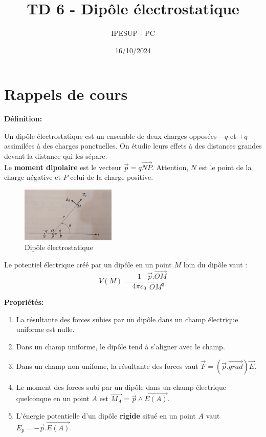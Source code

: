 \documentclass{article}
\title{TD 6 - Dipôle électrostatique}
\author{IPESUP - PC }
\date{16/10/2024}
\begin{document}
\maketitle

\section{Rappels de cours}

\textbf{Définition: }

Un dipôle électrostatique est un ensemble de deux charges opposées $-q$ et $+q$ assimilées à des charges ponctuelles. On étudie leurs effets à des distances grandes devant la distance qui les sépare. \\

Le \textbf{moment dipolaire} est le vecteur $\vec{p} = q \vec{NP}. $ Attention, $N$ est le point de la charge négative et $P$ celui de la charge positive.

\begin{figure}[h]
  \centering
  \includegraphics[width=0.4\textwidth]{dipôle schéma.jpg}
    \caption{Dipôle électrostatique}
\end{figure}

Le potentiel électrique créé par un dipôle en un point $M$ loin du dipôle vaut : \\
$$ V(M) = \dfrac{1}{4\pi \varepsilon_0} \dfrac{\vec{p}.\vec{OM}}{OM^3} $$


\textbf{Propriétés: }
\begin{enumerate}
  \item La résultante des forces subies par un dipôle dans un champ électrique uniforme est nulle.
  \item Dans un champ uniforme, le dipôle tend à s'aligner avec le champ.
  \item Dans un champ non unifome, la résultante des forces vaut $\vec{F} =(\vec{p}.\vec{grad})\vec{E}$. 
  \item Le moment des forces subi par un dipôle dans un champ électrique quelconque en un point $A$ est $\vec{M_A} = \vec{p} \wedge \vec{E(A)}$. 
  \item L'énergie potentielle d'un dipôle \textbf{rigide} situé en un point $A$ vaut $E_p = -\vec{p}.\vec{E(A)}$.
\end{enumerate}
\end{document}

